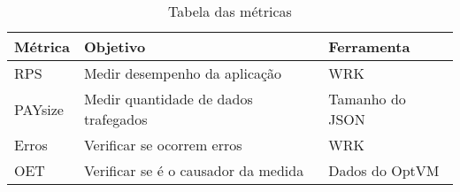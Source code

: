\begin{table}[!htb]
    \centering
    \caption[Métricas]{Tabela das métricas
    \label{tab:response-host}}
    \begin{tabular}{|m{3cm}|m{7cm}|m{4cm}|}
        \toprule
            Métrica & Objetivo & Ferramenta \\ 
        \midrule
            RPS & Medir desempenho da aplicação & WRK \\
            PAYsize & Medir quantidade de dados trafegados & Tamanho do JSON \\
            Erros & Verificar se ocorrem erros & WRK \\
            OET & Verificar se é o causador da medida & Dados do OptVM \\
        \bottomrule
    \end{tabular}
\end{table}

